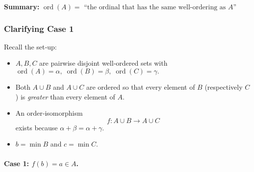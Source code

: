 \documentclass[12pt]{article}
\theoremstyle{definition} %
\theoremstyle{plain} %
\begin{document}
\bigskip
\textbf{Summary:} \;
$\boxed{\operatorname{ord}(A)=\text{ ``the ordinal that has the same well‑ordering as }A\text{''}}$
\subsubsection*{Clarifying Case 1}

Recall the set‑up:

\begin{itemize}
    \item $A,B,C$ are pairwise disjoint well‑ordered sets with
          \(\operatorname{ord}(A)=\alpha,\;
            \operatorname{ord}(B)=\beta,\;
            \operatorname{ord}(C)=\gamma.\)
    \item Both $A\cup B$ and $A\cup C$ are ordered so that every element
          of $B$ (respectively $C$) is \emph{greater} than every element of
          $A$.
    \item An order‑isomorphism
          \[
              f : A\cup B \longrightarrow A\cup C
          \]
          exists because
          \(\alpha+\beta=\alpha+\gamma.\)
    \item $b=\min B$ and $c=\min C$.
\end{itemize}

\paragraph{Case 1: \(f(b)=a\in A\).}
\end{document}
